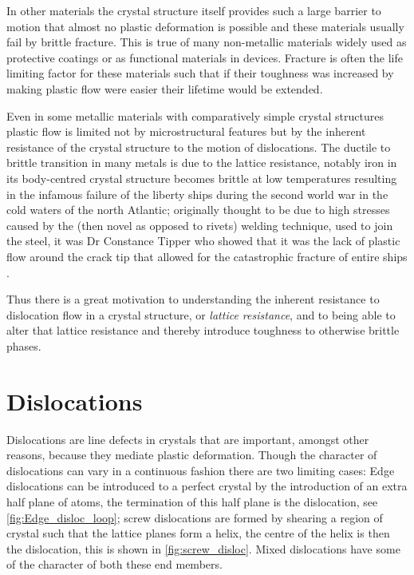 In other materials the crystal structure itself provides such a large barrier to motion that almost no plastic deformation is possible and these materials usually fail by brittle fracture. This is true of many non-metallic materials widely used as protective coatings or as functional materials in devices. Fracture is often the life limiting factor for these materials such that if their toughness was increased by making plastic flow were easier their lifetime would be extended. 

Even in some metallic materials with comparatively simple crystal structures plastic flow is limited not by microstructural features but by the inherent resistance of the crystal structure to the motion of dislocations. The ductile to brittle transition in many metals is due to the lattice resistance, notably iron in its body-centred crystal structure becomes brittle at low temperatures resulting in the infamous failure of the liberty ships during the second world war in the cold waters of the north Atlantic; originally thought to be due to high stresses caused by the (then novel as opposed to rivets) welding technique, used to join the steel, it was Dr Constance Tipper who showed that it was the lack of plastic flow around the crack tip that allowed for the catastrophic fracture of entire ships \cite{Cottrell1997}. 

Thus there is a great motivation to understanding the inherent resistance to dislocation flow in a crystal structure, or \emph{lattice resistance}, and to being able to alter that lattice resistance and thereby introduce toughness to otherwise brittle phases.


\section{Dislocations} %
\FloatBarrier

Dislocations are line defects in crystals that are important, amongst other reasons, because they mediate plastic deformation. Though the character of dislocations can vary in a continuous fashion there are two limiting cases: Edge dislocations can be introduced to a perfect crystal by the introduction of an extra half plane of atoms, the termination of this half plane is the dislocation, see \autoref{fig:Edge_disloc_loop}; screw dislocations are formed by shearing a region of crystal such that the lattice planes form a helix, the centre of the helix is then the dislocation, this is shown in \autoref{fig:screw_disloc}. Mixed dislocations have some of the character of both these end members.



